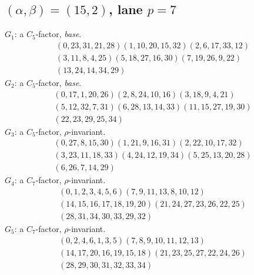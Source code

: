 \documentclass[11pt]{amsart}
\begin{document}
\subsection*{$(\alpha,\beta)=(15,2)$, lane $p=7$}
\smallskip\noindent $G_{1}$: a $C_5$-factor, \emph{base}.
\begin{gather*}
  (0,23,31,21,28)(1,10,20,15,32)(2,6,17,33,12) \\
  (3,11,8,4,25)(5,18,27,16,30)(7,19,26,9,22) \\
  (13,24,14,34,29)
\end{gather*}
\smallskip\noindent $G_{2}$: a $C_5$-factor, \emph{base}.
\begin{gather*}
  (0,17,1,20,26)(2,8,24,10,16)(3,18,9,4,21) \\
  (5,12,32,7,31)(6,28,13,14,33)(11,15,27,19,30) \\
  (22,23,29,25,34)
\end{gather*}
\smallskip\noindent $G_{3}$: a $C_5$-factor, $\rho$-invariant.
\begin{gather*}
  (0,27,8,15,30)(1,21,9,16,31)(2,22,10,17,32) \\
  (3,23,11,18,33)(4,24,12,19,34)(5,25,13,20,28) \\
  (6,26,7,14,29)
\end{gather*}
\smallskip\noindent $G_{4}$: a $C_7$-factor, $\rho$-invariant.
\begin{gather*}
  (0,1,2,3,4,5,6)(7,9,11,13,8,10,12) \\
  (14,15,16,17,18,19,20)(21,24,27,23,26,22,25) \\
  (28,31,34,30,33,29,32)
\end{gather*}
\smallskip\noindent $G_{5}$: a $C_7$-factor, $\rho$-invariant.
\begin{gather*}
  (0,2,4,6,1,3,5)(7,8,9,10,11,12,13) \\
  (14,17,20,16,19,15,18)(21,23,25,27,22,24,26) \\
  (28,29,30,31,32,33,34)
\end{gather*}
\end{document}
